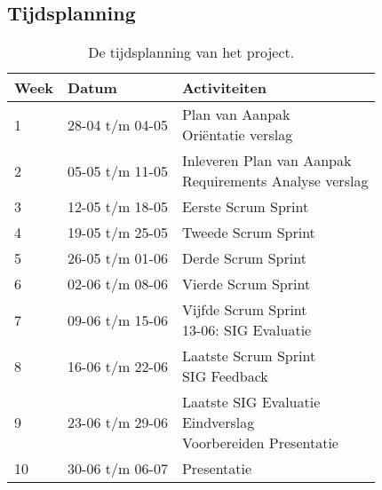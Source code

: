\begin{appendices}
	\section{Tijdsplanning} \label{app:A}
	\begin{table}[!h]
	\def\arraystretch{1.5}
	\begin{tabularx}{\textwidth}{| p{1cm} | p{3cm}| X |}
	\hline
	\textbf{Week} & \textbf{Datum} & \textbf{Activiteiten} \\ \hline
	1 & 28-04 t/m 04-05 & \specialcell{Plan van Aanpak\\Ori\"entatie verslag}\\ \hline
	2 & 05-05 t/m 11-05 & \specialcell{Inleveren Plan van Aanpak\\Requirements Analyse verslag}\\ \hline
	3 & 12-05 t/m 18-05 & Eerste Scrum Sprint\\ \hline
	4 & 19-05 t/m 25-05 & Tweede Scrum Sprint\\ \hline
	5 & 26-05 t/m 01-06 & Derde Scrum Sprint\\ \hline
	6 & 02-06 t/m 08-06 & Vierde Scrum Sprint\\ \hline
	7 & 09-06 t/m 15-06 & \specialcell{Vijfde Scrum Sprint\\13-06: SIG Evaluatie}\\ \hline
	8 & 16-06 t/m 22-06 & \specialcell{Laatste Scrum Sprint\\SIG Feedback}\\ \hline
	9 & 23-06 t/m 29-06 & \specialcell{Laatste SIG Evaluatie\\Eindverslag\\Voorbereiden Presentatie}\\ \hline
	10 & 30-06 t/m 06-07 & Presentatie\\ \hline
	\end{tabularx}
	\caption{De tijdsplanning van het project.}
	\end{table}

\end{appendices}